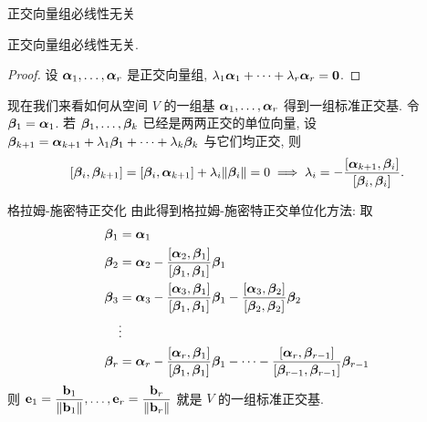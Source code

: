 \begin{frame}{正交向量组必线性无关}
	\onslide<+->
	\begin{theorem}
		正交向量组必线性无关.
	\end{theorem}
	\onslide<+->
	\begin{proof}
		设 $\bma_1,\dots,\bma_r$ 是正交向量组,
		$\lambda_1\bma_1+\cdots+\lambda_r\bma_r={\bf0}$.
		\onslide<+->{%
			故 $\bma_1,\dots,\bma_r$ 线性无关.\qedhere
		}
	\end{proof}
	
	\onslide<+->
	现在我们来看如何从空间 $V$ 的一组基 $\bma_1,\dots,\bma_r$ 得到一组标准正交基.
	\onslide<+->
	令 $\bmb_1=\bma_1$.
	\onslide<+->
	若 $\bmb_1,\dots,\bmb_k$ 已经是两两正交的单位向量, 设 $\bmb_{k+1}=\bma_{k+1}+\lambda_1\bmb_1+\dots+\lambda_k\bmb_k$ 与它们均正交, 
	\onslide<+->
	则
	\[[\bmb_i,\bmb_{k+1}]=[\bmb_i,\bma_{k+1}]+\lambda_i\|\bmb_i\|=0\implies\lambda_i=-\frac{[\bma_{k+1},\bmb_i]}{[\bmb_i,\bmb_i]}.\]
\end{frame}


\begin{frame}{格拉姆-施密特正交化}
	\onslide<+->
	由此得到\alert{格拉姆-施密特正交单位化方法:} 取
		\begin{align*}
			\bmb_1&=\bma_1\\
			\bmb_2&=\bma_2-\frac{[\bma_2,\bmb_1]}{[\bmb_1,\bmb_1]}\bmb_1\\
			\bmb_3&=\bma_3-\frac{[\bma_3,\bmb_1]}{[\bmb_1,\bmb_1]}\bmb_1-\frac{[\bma_3,\bmb_2]}{[\bmb_2,\bmb_2]}\bmb_2\\
			&\vdots\\
			\bmb_r&=\bma_r-\frac{[\bma_r,\bmb_1]}{[\bmb_1,\bmb_1]}\bmb_1-\cdots-\frac{[\bma_r,\bmb_{r-1}]}{[\bmb_{r-1},\bmb_{r-1}]}\bmb_{r-1}
		\end{align*}
	\onslide<+->
	则 $\bfe_1=\dfrac{\bfb_1}{\|\bfb_1\|},\dots,\bfe_r=\dfrac{\bfb_r}{\|\bfb_r\|}$ 就是 $V$ 的一组标准正交基.
\end{frame}



